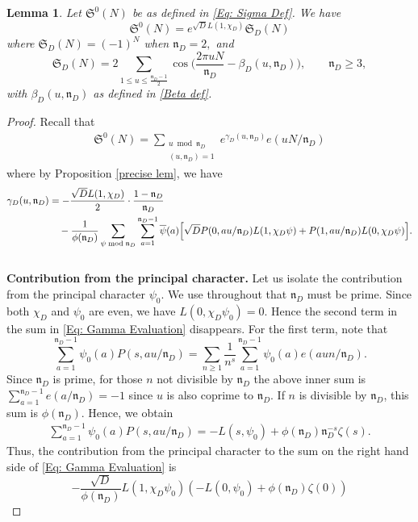 \documentclass[11pt]{amsart}
\numberwithin{equation}{section}
\newcommand{\mf}{\mathfrak}
\newcommand{\ol}{\overline}
\newcommand{\n}{\mf{n}_D}
\newtheorem{lem}[thm]{Lemma}
\theoremstyle{remark}
\begin{document}
\begin{lem}\label{Lem: Singular Series}
Let $\mf{S}^{0}(N)$ be as defined in \eqref{Eq: Sigma Def}. We have 
\[
\mf{S}^{0}(N)
=
e^{\sqrt{D}L(1,\chi_D)}
\mf{S}_D(N)\]
where $\mf{S}_D(N)=(-1)^N$ when $\n=2,$ and  
\[
\mf{S}_D(N)
=
2\sum_{1\leq u\leq \tfrac{\n-1}{2}}\cos\Big(\frac{2\pi uN}{\n}-\beta_{D}(u,\mf{n}_D)\Big), \quad \quad \n\geq 3,
\]
with $\beta_D(u,\mf{n}_D)$ as defined in \eqref{Beta def}. 
\end{lem}
\begin{proof}
Recall that 
\begin{align}\label{Eq: Sigma0}
\mf{S}^{0}(N)= \sum_{\substack{u \bmod \mf{n}_D \\ (u,\mf{n}_D)=1}}{e^{\gamma_{D}(u,\mf{n}_D)}e(uN/\mf{n}_D)}
\end{align}
where by Proposition \ref{precise lem}, we have
 \begin{align}\label{Eq: Gamma Evaluation}
\gamma_D(u,\mf{n}_D)
&=
-\frac{\sqrt{D} L(1,\chi_D)}{2} \cdot \frac{1-\mf{n}_D}{\mf{n}_D}
\notag \\
&\quad -
\frac{1}{\phi(\mf{n}_D)}\sum_{\psi\bmod \mf{n}_D} \sum_{a=1}^{\mf{n}_D-1}\ol{\psi}(a)\Big[\sqrt{D}P(0,au/\mf{n}_D)L(1,\chi_D\psi)
+
P(1,au/\mf{n}_D)L(0,\chi_D\psi)\Big].
 \end{align} \\
\noindent \textbf{Contribution from the principal character.} Let us isolate the contribution from the principal character $\psi_0$. We use throughout that $\mf{n}_D$ must be prime. Since both $\chi_D$ and $\psi_0$ are even, we have $L(0,\chi_D\psi_0)=0$. Hence the second term in the sum in \eqref{Eq: Gamma Evaluation} disappears.
 For the first term, note that 
 \[
\sum_{a=1}^{\mf{n}_D-1}\psi_0(a)P(s,au/\mf{n}_D)=\sum_{n\geq 1}\frac{1}{n^s}\sum_{a=1}^{\mf{n}_D-1}\psi_0(a)e(aun/\mf{n}_D).
 \]
 Since $\mf{n}_D$ is prime, for those $n$ not divisible by $\mf{n}_D$ the above inner sum is $\sum_{a=1}^{\mf{n}_D-1}e(a/\mf{n}_D)=-1$ since $u$ is also coprime to $\mf{n}_D$. If $n$ is divisible by $\mf{n}_D$, this sum is $\phi(\mf{n}_D)$. Hence, we obtain
 \begin{align}\label{Eq: Principal Character Relation}
    \sum_{a=1}^{\mf{n}_D-1}\psi_0(a)P(s,au/\mf{n}_D)
 =
 -L(s,\psi_0)+\phi(\mf{n}_D)\mf{n}_D^{-s}\zeta(s).
 \end{align}
Thus, the contribution from the principal character to the sum on the right hand side of \eqref{Eq: Gamma Evaluation} is
\[
 -\frac{\sqrt{D}}{\phi(\mf{n}_D)}L(1,\chi_D\psi_0)(-L(0,\psi_0)+\phi(\mf{n}_D)\zeta(0))
\]
\end{proof}
\end{document}
